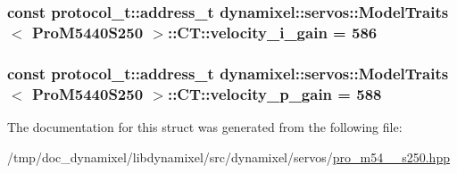 \subsubsection[{velocity\+\_\+i\+\_\+gain}]{\setlength{\rightskip}{0pt plus 5cm}const {\bf protocol\+\_\+t\+::address\+\_\+t} {\bf dynamixel\+::servos\+::\+Model\+Traits}$<$ {\bf Pro\+M5440\+S250} $>$\+::C\+T\+::velocity\+\_\+i\+\_\+gain = 586\hspace{0.3cm}{\ttfamily [static]}}\label{structdynamixel_1_1servos_1_1_model_traits_3_01_pro_m5440_s250_01_4_1_1_c_t_a729b745f4f0c2d11d11263500d33b56c}
\hypertarget{structdynamixel_1_1servos_1_1_model_traits_3_01_pro_m5440_s250_01_4_1_1_c_t_a92d82ae7ed22c79851f03b4f9c004b8b}{}
\subsubsection[{velocity\+\_\+p\+\_\+gain}]{\setlength{\rightskip}{0pt plus 5cm}const {\bf protocol\+\_\+t\+::address\+\_\+t} {\bf dynamixel\+::servos\+::\+Model\+Traits}$<$ {\bf Pro\+M5440\+S250} $>$\+::C\+T\+::velocity\+\_\+p\+\_\+gain = 588\hspace{0.3cm}{\ttfamily [static]}}\label{structdynamixel_1_1servos_1_1_model_traits_3_01_pro_m5440_s250_01_4_1_1_c_t_a92d82ae7ed22c79851f03b4f9c004b8b}


The documentation for this struct was generated from the following file\+:\begin{DoxyCompactItemize}
\item 
/tmp/doc\+\_\+dynamixel/libdynamixel/src/dynamixel/servos/\hyperlink{pro__m54__40__s250_8hpp}{pro\+\_\+m54\+\_\+\_\+s250.\+hpp}\end{DoxyCompactItemize}
